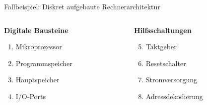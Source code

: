 \begin{frame}[allowframebreaks]{Fallbeispiel: Diskret aufgebaute Rechnerarchitektur}
    \begin{columns}
        \begin{column}[T]{.5\textwidth}
            \textbf{Digitale Bausteine}
            \begin{enumerate}
                \item Mikroprozessor
                \item Programmspeicher
                \item Hauptspeicher
                \item I/O-Ports
            \end{enumerate}
        \end{column}
        \begin{column}[T]{.5\textwidth}
            \textbf{Hilfsschaltungen}
            \begin{enumerate}
                \setcounter{enumi}{4}
                \item Taktgeber
                \item Resetschalter
                \item Stromversorgung
                \item Adressdekodierung
            \end{enumerate}
        \end{column}
    \end{columns}
\end{frame}


